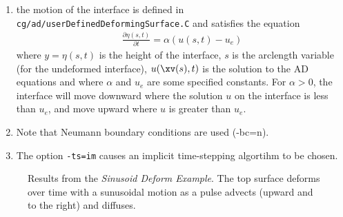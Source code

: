 \documentclass[10pt]{article}
\begin{document}
\begin{enumerate}
   \item the motion of the interface is defined in {\tt cg/ad/userDefinedDeformingSurface.C} and satisfies the equation
\begin{align*}
   \frac{\partial \eta(s,t)}{\partial t} = \alpha ( u(s,t) - u_e )  
\end{align*}
where $y=\eta(s,t)$ is the height of the interface, $s$ is the arclength variable (for the undeformed interface),
$u(\xv(s),t)$ is the solution to the AD equations and where $\alpha$ and $u_e$ are some specified constants.
For $\alpha>0$, the interface will move downward where the solution $u$ on the interface is less than $u_e$,
and move upward where $u$ is greater than $u_e$. 
  \item Note that Neumann boundary conditions are used (-bc=n). 
  \item The option {\tt -ts=im} causes an implicit time-stepping algortihm to be chosen.
\end{enumerate}

{
\begin{figure}[hbt]
\newcommand{\figWidth}{5.5cm}
\newcommand{\trimfig}[2]{\trimFig{#1}{#2}{0.1}{0.05}{.05}{.05}}
\begin{center}
\end{center}
\caption{Results from the {\em  Sinusoid Deform Example}. The top surface deforms over time with a sunusoidal motion as
a pulse advects (upward and to the right) and diffuses.}
\label{fig:pulseDeformSinusoid}
\end{figure}
}
\end{document}
